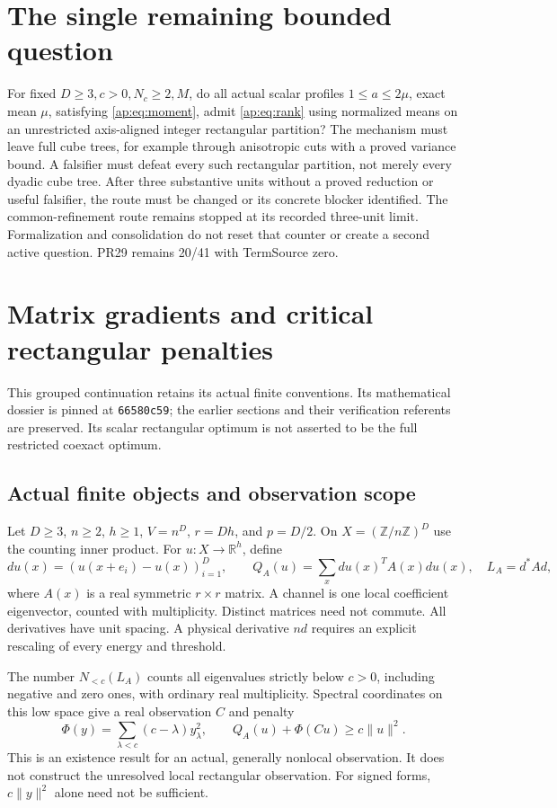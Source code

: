 \documentclass[11pt]{article}
\newcommand{\R}{\mathbb R}
\providecommand{\Nlow}{N_{<c}}
\begin{document}
\section{The single remaining bounded question}
For fixed $D\geq3,c>0,N_c\geq2,M$, do all actual scalar profiles
$1\leq a\leq2\mu$, exact mean $\mu$, satisfying \eqref{ap:eq:moment}, admit
\eqref{ap:eq:rank} using normalized means on an unrestricted axis-aligned integer
rectangular partition? The mechanism must leave full cube trees, for example through
anisotropic cuts with a proved variance bound. A falsifier must defeat every such
rectangular partition, not merely every dyadic cube tree. After three substantive units
without a proved reduction or useful falsifier, the route must be changed or its concrete
blocker identified. The common-refinement route remains stopped at its recorded three-unit limit.
Formalization and consolidation do not reset that counter or create a second
active question. PR29 remains 20/41 with TermSource zero.


\clearpage
\section{Matrix gradients and critical rectangular penalties}\label{sec:matrix-continuation}
This grouped continuation retains its actual finite conventions. Its mathematical dossier is pinned at \texttt{66580c59}; the earlier sections and their verification referents are preserved. Its scalar rectangular optimum is not asserted to be the full restricted coexact optimum.
\subsection{Actual finite objects and observation scope}
Let $D\geq3$, $n\geq2$, $h\geq1$, $V=n^D$, $r=Dh$, and $p=D/2$.
On $X=(\mathbb Z/n\mathbb Z)^D$ use the counting inner product. For
$u:X\to\R^h$, define
\[
 du(x)=(u(x+e_i)-u(x))_{i=1}^D,\qquad
 Q_A(u)=\sum_x du(x)^T A(x)du(x),\quad L_A=d^*A d,
\]
where $A(x)$ is a real symmetric $r\times r$ matrix. A channel is one local
coefficient eigenvector, counted with multiplicity. Distinct matrices need
not commute. All derivatives have unit spacing. A physical derivative $nd$
requires an explicit rescaling of every energy and threshold.

The number $\Nlow(L_A)$ counts all eigenvalues strictly below $c>0$,
including negative and zero ones, with ordinary real multiplicity. Spectral
coordinates on this low space give a real observation $C$ and penalty
\begin{equation}\label{mx:eq:penalty}
 \Phi(y)=\sum_{\lambda<c}(c-\lambda)y_\lambda^2,
 \qquad Q_A(u)+\Phi(Cu)\geq c\|u\|^2.
\end{equation}
This is an existence result for an actual, generally nonlocal observation.
It does not construct the unresolved local rectangular observation.
For signed forms, $c\|y\|^2$ alone need not be sufficient.
\end{document}
